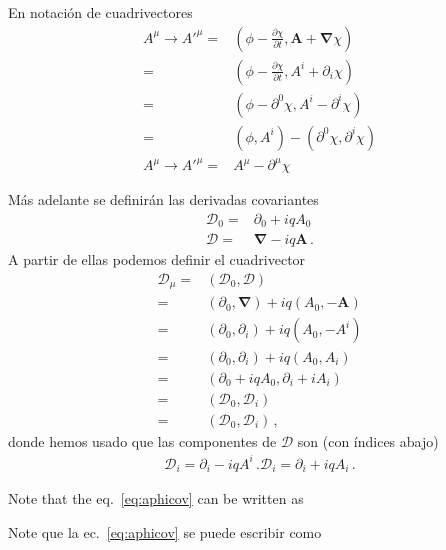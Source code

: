 En notaci\'on de cuadrivectores
\begin{align}
  A^\mu\to {A'}^\mu=&\left(\phi-\frac{\partial\chi}{\partial t},\mathbf{A}+\boldsymbol{\nabla}\chi
  \right)\nonumber\\
  =&\left(\phi-\frac{\partial\chi}{\partial t},A^{i}+\partial_i\chi
  \right)\nonumber\\
  =&\left(\phi-\partial^0\chi,A^{i}-\partial^{i}\chi
  \right)\nonumber\\
  =&\left(\phi,A^{i}
  \right)-
  \left(
    \partial^0\chi,\partial^{i}\chi
  \right)\nonumber\\
  \label{eq:aphicov}
  A^\mu\to {A'}^\mu=&A^\mu-\partial^\mu\chi
\end{align}




Más adelante se definirán las derivadas  covariantes
\begin{align}
   \mathcal{D}_0=&\partial_0+i q A_0\nonumber\\
  \boldsymbol{\mathcal{D}}=&\boldsymbol{\nabla}-i q \mathbf{A}\,.
\end{align}
A partir de ellas podemos definir el cuadrivector
\begin{align}
  \mathcal{D}_\mu=&(\mathcal{D}_0,\boldsymbol{\mathcal{D}})\nonumber\\
=&(\partial_0,\boldsymbol{\nabla})+i q(A_0,-\mathbf{A})\nonumber\\
=&(\partial_0,\partial_i)+i q(A_0,-A^i)\nonumber\\
=&(\partial_0,\partial_i)+i q(A_0,A_i)\nonumber\\
=&(\partial_0+i q A_0,\partial_i+i A_i)\nonumber\\
=&(\mathcal{D}_0,\mathcal{D}_i)\nonumber\\
=&(\mathcal{D}_0,\mathcal{D}_i)\,,
\end{align}
donde hemos usado que las componentes de $\mathcal{D}$ son (con índices abajo)
\begin{align}
\mathcal{D}_i=\partial_i-i q A^i\,.
  \mathcal{D}_i=\partial_i+i q A_i\,.
\end{align}

\begin{english}
Note that the eq.~\eqref{eq:aphicov} can be written as  
\end{english}
\begin{spanish}
Note que la ec.~\eqref{eq:aphicov} se puede escribir como
\end{spanish}

